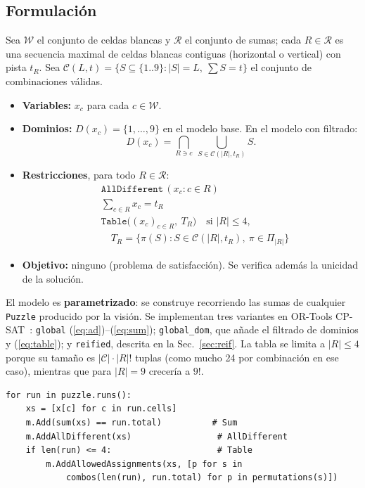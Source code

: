 \documentclass[conference,a4paper]{IEEEtran}\def\HAVEIEEE{1}%
\begin{document}
\subsection{Formulación}
Sea $\mathcal{W}$ el conjunto de celdas blancas y $\mathcal{R}$ el conjunto de sumas; cada $R\in\mathcal{R}$ es una secuencia maximal de celdas blancas contiguas (horizontal o vertical) con pista $t_R$. Sea $\mathcal{C}(L,t)=\{S\subseteq\{1..9\}:|S|=L,\ \sum S=t\}$ el conjunto de combinaciones válidas.
\begin{itemize}
  \item \textbf{Variables:} $x_c$ para cada $c\in\mathcal{W}$.
  \item \textbf{Dominios:} $D(x_c)=\{1,\dots,9\}$ en el modelo base. En el modelo con filtrado:
  \begin{equation}
  D(x_c)=\bigcap_{R\ni c}\ \bigcup_{S\in\mathcal{C}(|R|,t_R)} S .
  \end{equation}
  \item \textbf{Restricciones}, para todo $R\in\mathcal{R}$:
  \begin{align}
  &\texttt{AllDifferent}\,(x_c : c\in R) \label{eq:ad}\\
  &\textstyle\sum_{c\in R} x_c = t_R \label{eq:sum}\\
  &\texttt{Table}\big((x_c)_{c\in R},\ T_R\big)\quad\text{si } |R|\le4, \label{eq:table}\\
  &\quad T_R=\{\pi(S):S\in\mathcal{C}(|R|,t_R),\ \pi\in\Pi_{|R|}\}\nonumber
  \end{align}
  \item \textbf{Objetivo:} ninguno (problema de satisfacción). Se verifica además la unicidad de la solución.
\end{itemize}
El modelo es \textbf{parametrizado}: se construye recorriendo las sumas de cualquier \texttt{Puzzle} producido por la visión. Se implementan tres variantes en OR-Tools CP-SAT~\cite{ortools}: \texttt{global} (\ref{eq:ad})--(\ref{eq:sum}); \texttt{global\_dom}, que añade el filtrado de dominios y (\ref{eq:table}); y \texttt{reified}, descrita en la Sec.~\ref{sec:reif}. La tabla se limita a $|R|\le4$ porque su tamaño es $|\mathcal{C}|\cdot|R|!$ tuplas (como mucho 24 por combinación en ese caso), mientras que para $|R|=9$ crecería a $9!$.

\begin{lstlisting}[caption={Núcleo del modelo en CP-SAT (\texttt{kakuro/solver.py}).}]
for run in puzzle.runs():
    xs = [x[c] for c in run.cells]
    m.Add(sum(xs) == run.total)          # Sum
    m.AddAllDifferent(xs)                 # AllDifferent
    if len(run) <= 4:                     # Table
        m.AddAllowedAssignments(xs, [p for s in
            combos(len(run), run.total) for p in permutations(s)])
\end{lstlisting}
\end{document}
